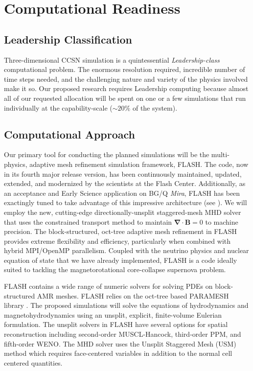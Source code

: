 \section{Computational Readiness}

\subsection{Leadership Classification}
Three-dimensional CCSN simulation is a quintessential {\it
  Leadership-class} computational problem. The enormous resolution
required, incredible number of time steps needed, and the challenging
nature and variety of the physics involved make it so. Our proposed
research requires Leadership computing because almost all of our requested allocation
will be spent on one or a few simulations that run individually at the
capability-scale ($\sim20\%$ of the system).

\subsection{Computational Approach}
\label{sec:approach}

Our primary tool for conducting the planned simulations will be the multi-physics, adaptive mesh refinement simulation framework, FLASH.
The code, now in its fourth major release version, has been continuously maintained, updated, extended, and modernized by the scientists at the Flash Center.
Additionally, as an acceptance and Early Science application on BG/Q {\it Mira}, FLASH has been exactingly tuned to take advantage of this impressive architecture (see \citet{Daley:2013esp}).
We will employ the new, cutting-edge directionally-unsplit staggered-mesh MHD solver \citep{Lee:2013cd} that uses the constrained transport method to maintain $\pmb{\nabla \cdot B} = 0$ to machine precision.
The block-structured, oct-tree adaptive mesh refinement in FLASH provides extreme flexibility and efficiency, particularly when combined with hybrid MPI/OpenMP parallelism.
Coupled with the neutrino physics and nuclear equation of state that we have already implemented, FLASH is a code ideally suited to tackling the magnetorotational core-collapse supernova problem.

FLASH contains a wide range of numeric solvers for solving
PDEs on block-structured AMR meshes. FLASH relies on the oct-tree
based PARAMESH library \citep{MacNeice:2000fc}. The proposed
simulations will solve the equations of hydrodynamics and
magnetohydrodynamics using an unsplit, explicit, finite-volume
Eulerian formulation. The unsplit solvers in FLASH have several
options for spatial reconstruction including second-order
MUSCL-Hancock, third-order PPM, and fifth-order WENO. The MHD solver
uses the Unsplit Staggered Mesh (USM) method which requires
face-centered variables in addition to the normal cell centered
quantities.

